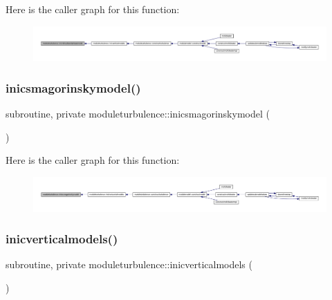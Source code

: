 Here is the caller graph for this function\+:\nopagebreak
\begin{figure}[H]
\begin{center}
\leavevmode
\includegraphics[width=350pt]{namespacemoduleturbulence_a59fa0936c4e079b4094b7b50f09a8092_icgraph}
\end{center}
\end{figure}
\mbox{\label{namespacemoduleturbulence_a3ccb54fdbe649b382ed14de6135fd7b9}} 
\subsubsection{\texorpdfstring{inicsmagorinskymodel()}{inicsmagorinskymodel()}}
{\footnotesize\ttfamily subroutine, private moduleturbulence\+::inicsmagorinskymodel (\begin{DoxyParamCaption}{ }\end{DoxyParamCaption})\hspace{0.3cm}{\ttfamily [private]}}

Here is the caller graph for this function\+:\nopagebreak
\begin{figure}[H]
\begin{center}
\leavevmode
\includegraphics[width=350pt]{namespacemoduleturbulence_a3ccb54fdbe649b382ed14de6135fd7b9_icgraph}
\end{center}
\end{figure}
\mbox{\label{namespacemoduleturbulence_a676ecd9b2dc8e4fd2506801b206e0fdc}} 
\subsubsection{\texorpdfstring{inicverticalmodels()}{inicverticalmodels()}}
{\footnotesize\ttfamily subroutine, private moduleturbulence\+::inicverticalmodels (\begin{DoxyParamCaption}{ }\end{DoxyParamCaption})\hspace{0.3cm}{\ttfamily [private]}}

